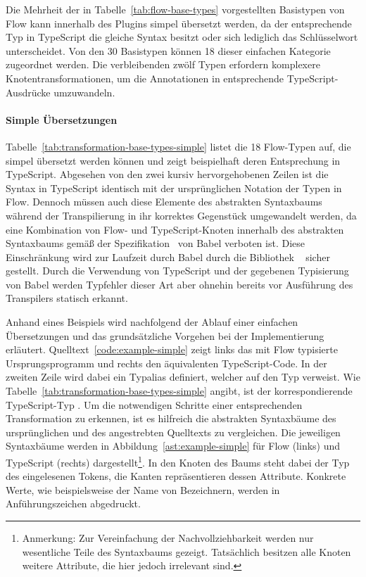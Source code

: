 Die Mehrheit der in Tabelle~\ref{tab:flow-base-types} vorgestellten Basistypen von Flow kann innerhalb des Plugins simpel übersetzt werden, da der entsprechende Typ in TypeScript die gleiche Syntax besitzt oder sich lediglich das Schlüsselwort unterscheidet. Von den 30 Basistypen können 18 dieser einfachen Kategorie zugeordnet werden. Die verbleibenden zwölf Typen erfordern komplexere Knotentransformationen, um die Annotationen in entsprechende TypeScript-Ausdrücke umzuwandeln.

\paragraph{Simple Übersetzungen}

Tabelle~\ref{tab:transformation-base-types-simple} listet die 18 Flow-Typen auf, die simpel übersetzt werden können und zeigt beispielhaft deren Entsprechung in TypeScript. Abgesehen von den zwei kursiv hervorgehobenen Zeilen ist die Syntax in TypeScript identisch mit der ursprünglichen Notation der Typen in Flow. Dennoch müssen auch diese Elemente des abstrakten Syntaxbaums während der Transpilierung in ihr korrektes Gegenstück umgewandelt werden, da eine Kombination von Flow- und TypeScript-Knoten innerhalb des abstrakten Syntaxbaums gemäß der Spezifikation~\autocite{BABEL:PARSER_SPEC} von Babel verboten ist. Diese Einschränkung wird zur Laufzeit durch Babel durch die Bibliothek ~\autocite{BABEL:TYPES} sicher gestellt. Durch die Verwendung von TypeScript und der gegebenen Typisierung von Babel werden Typfehler dieser Art aber ohnehin bereits vor Ausführung des Transpilers statisch erkannt.



Anhand eines Beispiels wird nachfolgend der Ablauf einer einfachen Übersetzungen und das grundsätzliche Vorgehen bei der Implementierung erläutert. Quelltext~\ref{code:example-simple} zeigt links das mit Flow typisierte Ursprungsprogramm und rechts den äquivalenten TypeScript-Code. In der zweiten Zeile wird dabei ein Typalias definiert, welcher auf den Typ
 verweist. Wie Tabelle~\ref{tab:transformation-base-types-simple} angibt, ist der korrespondierende TypeScript-Typ . Um die notwendigen Schritte einer entsprechenden Transformation zu erkennen, ist es hilfreich die abstrakten Syntaxbäume des ursprünglichen und des angestrebten Quelltexts zu vergleichen. Die jeweiligen Syntaxbäume werden in Abbildung~\ref{ast:example-simple} für Flow (links) und TypeScript (rechts) dargestellt\footnote{Anmerkung: Zur Vereinfachung der Nachvollziehbarkeit werden nur wesentliche Teile des Syntaxbaums gezeigt. Tatsächlich besitzen alle Knoten weitere Attribute, die hier jedoch irrelevant sind.}. In den Knoten des Baums steht dabei der Typ des eingelesenen Tokens, die Kanten repräsentieren dessen Attribute. Konkrete Werte, wie beispielsweise der Name von Bezeichnern, werden in Anführungszeichen abgedruckt.

